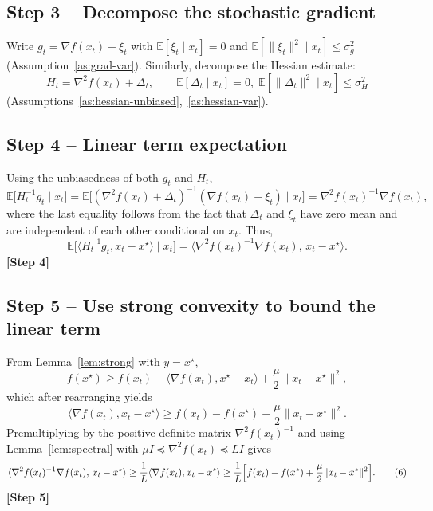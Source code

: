 \documentclass[11pt]{article}
\begin{document}
\subsection*{Step 3 – Decompose the stochastic gradient}
Write $g_{t}= \nabla f(x_{t})+\xi_{t}$ with $\mathbb{E}[\xi_{t}\mid x_{t}]=0$ and
$\mathbb{E}[\|\xi_{t}\|^{2}\mid x_{t}]\le\sigma_{g}^{2}$ (Assumption~\ref{as:grad-var}).
Similarly, decompose the Hessian estimate:
\[
H_{t}= \nabla^{2}f(x_{t})+\Delta_{t},
\qquad\mathbb{E}[\Delta_{t}\mid x_{t}]=0,\;
\mathbb{E}[\|\Delta_{t}\|^{2}\mid x_{t}]\le\sigma_{H}^{2}
\]
(Assumptions~\ref{as:hessian-unbiased},~\ref{as:hessian-var}).

\subsection*{Step 4 – Linear term expectation}
Using the unbiasedness of both $g_{t}$ and $H_{t}$,
\[
\mathbb{E}\!\bigl[H_{t}^{-1}g_{t}\mid x_{t}\bigr]
= \mathbb{E}\!\bigl[(\nabla^{2}f(x_{t})+\Delta_{t})^{-1}
(\nabla f(x_{t})+\xi_{t})\mid x_{t}\bigr]
= \nabla^{2}f(x_{t})^{-1}\nabla f(x_{t}) ,
\]
where the last equality follows from the fact that $\Delta_{t}$ and $\xi_{t}$
have zero mean and are independent of each other conditional on $x_{t}$.
Thus,
\[
\mathbb{E}\!\bigl[\langle H_{t}^{-1}g_{t},x_{t}-x^{\star}\rangle\mid x_{t}\bigr]
= \langle \nabla^{2}f(x_{t})^{-1}\nabla f(x_{t}),\,x_{t}-x^{\star}\rangle .
\tag{4}
\]
\textbf{[Step 4]}

\subsection*{Step 5 – Use strong convexity to bound the linear term}
From Lemma~\ref{lem:strong} with $y=x^{\star}$,
\[
f(x^{\star})\ge f(x_{t})+\langle\nabla f(x_{t}),x^{\star}-x_{t}\rangle
+\frac{\mu}{2}\|x_{t}-x^{\star}\|^{2},
\]
which after rearranging yields
\[
\langle\nabla f(x_{t}),x_{t}-x^{\star}\rangle
\ge f(x_{t})-f(x^{\star})+\frac{\mu}{2}\|x_{t}-x^{\star}\|^{2}. \tag{5}
\]
Premultiplying by the positive definite matrix $\nabla^{2}f(x_{t})^{-1}$ and using
Lemma~\ref{lem:spectral} with $\mu I\preceq\nabla^{2}f(x_{t})\preceq L I$ gives
\[
\langle \nabla^{2}f(x_{t})^{-1}\nabla f(x_{t}),\,x_{t}-x^{\star}\rangle
\ge \frac{1}{L}\langle\nabla f(x_{t}),x_{t}-x^{\star}\rangle
\ge \frac{1}{L}\Bigl[f(x_{t})-f(x^{\star})+\frac{\mu}{2}\|x_{t}-x^{\star}\|^{2}\Bigr].
\tag{6}
\]
\textbf{[Step 5]}
\end{document}
